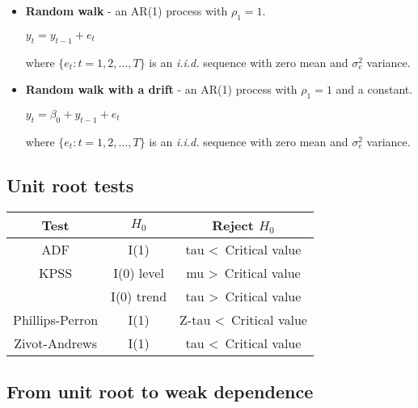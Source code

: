 \documentclass[10pt, a4paper, landscape]{article}
\begin{document}
\begin{multicols}{3}
		\begin{itemize}[leftmargin=*]
			\item \textbf{Random walk} - an AR(1) process with $\rho_{1} = 1$.
			
			\begin{center}
				$y_{t} = y_{t - 1} + e_{t}$
			\end{center}
			
			where $\lbrace e_{t} : t = 1, 2, \ldots, T \rbrace$ is an \textsl{i.i.d.} sequence with zero mean and $\sigma^{2}_{e}$ variance.
			
			\item \textbf{Random walk with a drift} - an AR(1) process with $\rho_{1} = 1$ and a constant.
			
			\begin{center}
				$y_{t} = \beta_{0} + y_{t - 1} + e_{t}$
			\end{center}
			
			where $\lbrace e_{t} : t = 1, 2, \ldots, T \rbrace$ is an \textsl{i.i.d.} sequence with zero mean and $\sigma^{2}_{e}$ variance.
		\end{itemize}
		
		\subsection*{Unit root tests}
		
		\begin{center}
			\begin{tabular}{ c | c | c }
				Test            & $H_{0}$    & Reject $H_{0}$                     \\ \hline
				ADF             & I(1)       & tau \textless \, Critical value    \\ \hline
				KPSS            & I(0) level & mu \textgreater \, Critical value  \\
				                & I(0) trend & tau \textgreater \, Critical value \\ \hline
				Phillips-Perron & I(1)       & Z-tau \textless \, Critical value  \\ \hline
				Zivot-Andrews   & I(1)       & tau \textless \, Critical value
			\end{tabular}
		\end{center}
		
		\subsection*{From unit root to weak dependence}
		

\end{multicols}
\end{document}

